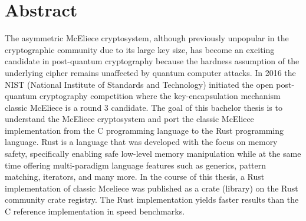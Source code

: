\documentclass[11pt,
  oneside,openany,    %
]{scrreprt}
\begin{document}









\printthesistitle

\chapter*{Abstract}
The asymmetric McEliece cryptosystem, although previously unpopular in the cryptographic community due to its large key size, has become an exciting candidate in post-quantum cryptography because the hardness assumption of the underlying cipher remains unaffected by quantum computer attacks. In 2016 the NIST (National Institute of Standards and Technology) initiated the open post-quantum cryptography competition where the key-encapsulation mechanism classic McEliece is a round 3 candidate. The goal of this bachelor thesis is to understand the McEliece cryptosystem and port the classic McEliece implementation from the C programming language to the Rust programming language. Rust is a language that was developed with the focus on memory safety, specifically enabling safe low-level memory manipulation while at the same time offering multi-paradigm language features such as generics, pattern matching, iterators, and many more. In the course of this thesis, a Rust implementation of classic Mceliece was published as a crate (library) on the Rust community crate registry. The Rust implementation yields faster results than the C reference implementation in speed benchmarks.
\end{document}
